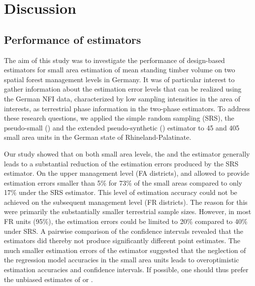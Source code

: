 \section{Discussion}
\label{sec:Dis}

\subsection{Performance of estimators}

The aim of this study was to investigate the performance of design-based estimators for small area estimation of mean standing timber volume on two spatial forest management levels in Germany. It was of particular interest to gather information about the estimation error levels that can be realized using the German NFI data, characterized by low sampling intensities in the area of interests, as terrestrial phase information in the two-phase estimators. To address these research questions, we applied the simple random sampling (SRS), the pseudo-small (\psmall{}) and the extended pseudo-synthetic (\extpsynth{}) estimator to 45 and 405 small area units in the German state of Rhineland-Palatinate.\par

Our study showed that on both small area levels, the \psmall{} and the \extpsynth{} estimator generally leads to a substantial reduction of the estimation errors produced by the SRS estimator. On the upper management level (FA districts), \psmall{} and \extpsynth{} allowed to provide estimation errors smaller than 5\% for 73\% of the small areas compared to only 17\% under the SRS estimator. This level of estimation accuracy could not be achieved on the subsequent management level (FR districts). The reason for this were primarily the substantially smaller terrestrial sample sizes. However, in most FR units (95\%), the estimation errors could be limited to 20\% compared to 40\% under SRS. A pairwise comparison of the confidence intervals revealed that the estimators did thereby not produce significantly different point estimates. The much smaller estimation errors of the \psynth{} estimator suggested that the neglection of the regression model accuracies in the small area units leads to overoptimistic estimation accuracies and confidence intervals. If possible, one should thus prefer the unbiased estimates of \psmall{} or \extpsynth{}.\par

